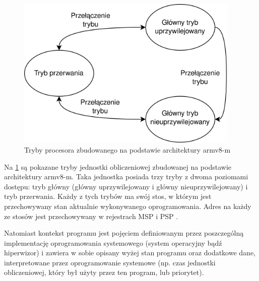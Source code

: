 \documentclass[../main]{subfiles}
\begin{document}
\begin{figure}[h]
    \centering
    \includegraphics[width=0.95\textwidth]{Images/armv8m-modes.png}
    \caption{Tryby procesora zbudowanego na podstawie architektury \acrshort{arm}v8-\acrshort{m}
    \cite{armv8mintro}}
    \label{fig:armv8-m-modes}
\end{figure}

Na \cref{fig:armv8-m-modes} są pokazane tryby jednostki obliczeniowej zbudowanej na podstawie
architektury \acrshort{arm}v8-\acrshort{m}. Taka jednostka posiada trzy tryby z dwoma poziomami
dostępu: tryb główny (główny uprzywilejowany i główny nieuprzywilejowany) i tryb przerwania. Każdy z
tych trybów ma swój stos, w którym jest przechowywany stan aktualnie wykonywanego oprogramowania.
Adres na każdy ze stosów jest przechowywany w rejestrach MSP i PSP \cite{armv8mintro}.

Natomiast kontekst programu jest pojęciem definiowanym przez poszczególną implementację oprogramowania
systemowego (system operacyjny bądź hiperwizor) i zawiera w sobie opisany wyżej stan programu oraz
dodatkowe dane, interpretowane przez oprogramowanie systemowe (np. czas jednostki obliczeniowej, który
był użyty przez ten program, lub priorytet).
\end{document}
